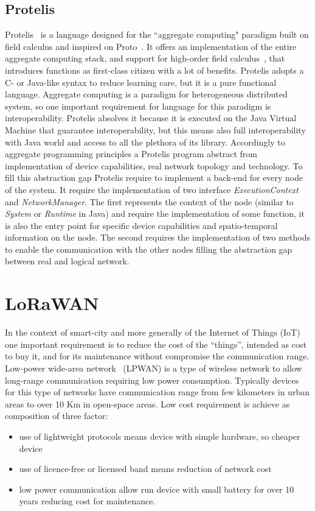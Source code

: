 \subsection{Protelis}
\label{subSec:Protelis}
Protelis~\cite{PianiniSAC2015} is a language designed for the ``aggregate computing" paradigm built on field calculus and inspired on Proto~\cite{Proto}. 
It offers an implementation of the entire aggregate computing stack, and support for high-order field calculus~\cite{ViroliTOCL2016}, that introduces functions as first-class citizen with a lot of benefits.
Protelis adopts a C- or Java-like syntax to reduce learning care, but it is a pure functional language.
Aggregate computing is a paradigm for heterogeneous distributed system, so one important requirement for language for this paradigm is interoperability.
Protelis absolves it because it is executed on the Java Virtual Machine that guarantee interoperability, but this means also full interoperability with Java world and access to all the plethora of its library.
Accordingly to aggregate programming principles a Protelis program abstract from implementation of device capabilities, real network topology and technology. To fill this abstraction gap Protelis require to implement a back-end for every node of the system.
It require the implementation of two interface \textit{ExecutionContext} and \textit{NetworkManager}. The first represents the context of the node (similar to \textit{System} or \textit{Runtime} in Java) and require the implementation of some function, it is also the entry point for specific device capabilities and spatio-temporal information on the node. The second requires the implementation of two methods to enable the communication with the other nodes filling the abstraction gap between real and logical network.
\clearpage
\section{LoRaWAN}
\label{sec:LoRaWAN}

In the context of smart-city and more generally of the Internet of Things (IoT) one important requirement is to reduce the cost of the ``things'', intended as cost to buy it, and for its maintenance without compromise the communication range.
Low-power wide-area network~\cite{Raza2017} (LPWAN) is a type of wireless network to allow long-range communication requiring low power consumption.
Typically devices for this type of networks have communication range from few kilometers in urban areas to over 10 Km in open-space areas.
Low cost requirement is achieve as composition of three factor:
\begin{itemize}
    \item use of lightweight protocols means device with simple hardware, so cheaper device
    \item use of licence-free or licensed band means reduction of network cost
    \item low power communication allow run device with small battery for over 10 years reducing cost for maintenance.
\end{itemize}

